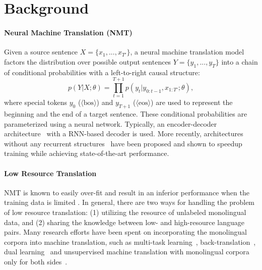 \section{Background}
\paragraph{Neural Machine Translation (NMT)}
Given a source sentence $X=\{x_1, ..., x_{T'}\}$, a neural machine translation model factors the distribution over possible output sentences $Y=\{y_1, ..., y_T\}$ into a chain of conditional probabilities with a left-to-right causal structure:
\begin{equation}
p(Y|X; \theta) = \prod_{t=1}^{T+1} p(y_t| y_{0:t-1}, x_{1:T'}; \theta),
\end{equation}
where special tokens $y_0$ ($\langle \mathrm{bos}\rangle$) and $y_{T+1}$ ($\langle \mathrm{eos}\rangle$) are used to represent the beginning and the end of a target sentence.
These conditional probabilities are parameterized using a neural network. Typically, an encoder-decoder architecture~\citep{sutskever2014sequence,Cho2014a,bahdanau2014neural} with a RNN-based decoder is used. More recently, architectures without any recurrent structures~\citep{gehring2017convolutional,vaswani2017attention} have been proposed and shown to speedup training while achieving state-of-the-art performance.



\paragraph{Low Resource Translation}
NMT is known to easily over-fit and result in an inferior performance when the training data is limited \cite{koehn2017six}.
In general, there are two ways for handling the problem of low resource translation: (1) utilizing the resource of unlabeled monolingual data, and (2) sharing the knowledge between low- and high-resource language pairs. Many research efforts have been spent on incorporating the monolingual corpora into machine translation, such as multi-task learning~\citep{Gulcehre-Orhan-et-al-2015,zhang2016exploiting}, back-translation~\citep{sennrich2015improving}, dual learning~\citep{he2016dual} and unsupervised machine translation with monolingual corpora only for both sides~\citep{artetxe2017unsupervised,lample2017unsupervised,yang2018unsupervised}. 


